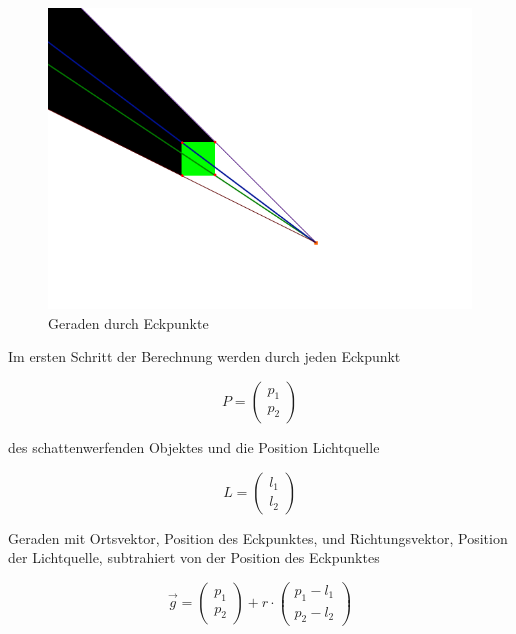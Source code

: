 \begin{figure}[t]
	\centering
	\includegraphics[width=\columnwidth]{images/durchfuehrung_1.png}
	\caption{Geraden durch Eckpunkte}
	\label{fig:durch2}
\end{figure}

Im ersten Schritt der Berechnung werden durch jeden Eckpunkt

\begin{equation}
	P = \begin{pmatrix} p_1 \\ p_2 \end{pmatrix}
\end{equation}

des schattenwerfenden Objektes und die Position Lichtquelle

\begin{equation}
	L = \begin{pmatrix}  l_1 \\ l_2 \end{pmatrix}
\end{equation}

Geraden mit Ortsvektor, Position des Eckpunktes, und Richtungsvektor, Position der Lichtquelle,
subtrahiert von der Position des Eckpunktes

\begin{equation}
	\vec{g} = \begin{pmatrix} p_1 \\ p_2 \end{pmatrix} + r \cdot \begin{pmatrix} p_1 - l_1 \\ p_2 - l_2 \end{pmatrix}
\end{equation}

